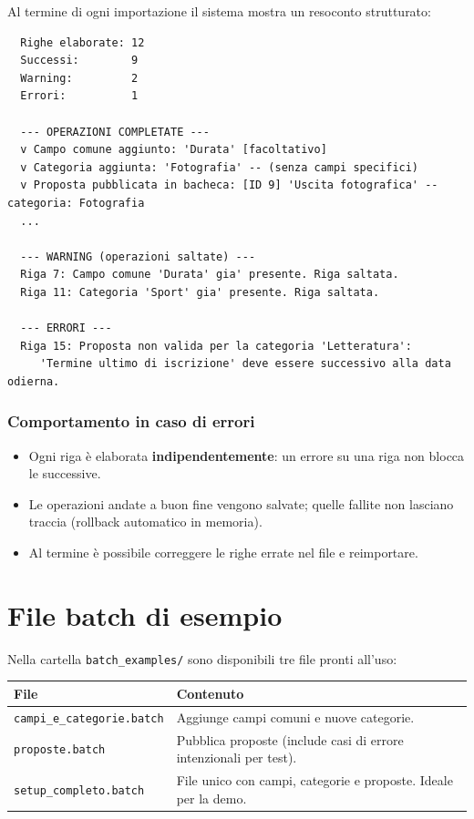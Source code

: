 \documentclass[12pt,a4paper,oneside]{report}
\newcommand{\file}[1]{\texttt{\small#1}}
\begin{document}
Al termine di ogni importazione il sistema mostra un resoconto strutturato:

\begin{lstlisting}
  Righe elaborate: 12
  Successi:        9
  Warning:         2
  Errori:          1

  --- OPERAZIONI COMPLETATE ---
  v Campo comune aggiunto: 'Durata' [facoltativo]
  v Categoria aggiunta: 'Fotografia' -- (senza campi specifici)
  v Proposta pubblicata in bacheca: [ID 9] 'Uscita fotografica' -- categoria: Fotografia
  ...

  --- WARNING (operazioni saltate) ---
  Riga 7: Campo comune 'Durata' gia' presente. Riga saltata.
  Riga 11: Categoria 'Sport' gia' presente. Riga saltata.

  --- ERRORI ---
  Riga 15: Proposta non valida per la categoria 'Letteratura': 
     'Termine ultimo di iscrizione' deve essere successivo alla data odierna.
\end{lstlisting}

\subsubsection{Comportamento in caso di errori}
\begin{itemize}
  \item Ogni riga è elaborata \textbf{indipendentemente}: un errore su una riga non blocca le successive.
  \item Le operazioni andate a buon fine vengono salvate; quelle fallite non lasciano traccia (rollback automatico in memoria).
  \item Al termine è possibile correggere le righe errate nel file e reimportare.
\end{itemize}

\section{File batch di esempio}

Nella cartella \file{batch\_examples/} sono disponibili tre file pronti all'uso:

\begin{center}
\begin{tabular}{L{5.5cm}L{7.5cm}}
\toprule
\textbf{File} & \textbf{Contenuto} \\
\midrule
\file{campi\_e\_categorie.batch} & Aggiunge campi comuni e nuove categorie. \\
\file{proposte.batch} & Pubblica proposte (include casi di errore intenzionali per test). \\
\file{setup\_completo.batch} & File unico con campi, categorie e proposte. Ideale per la demo. \\
\bottomrule
\end{tabular}
\end{center}
\end{document}
